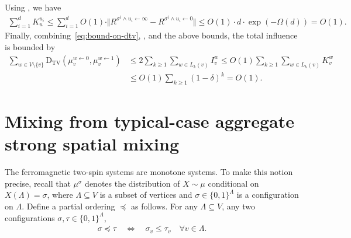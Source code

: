 \documentclass[11pt]{amsart}
\def\-#1{\mathrm{#1}}
\newcommand{\DTV}[2]{\-D_{\mathrm{TV}}\left({#1},{#2}\right)}
\theoremstyle{definition}
\theoremstyle{remark}
\begin{document}
Using , we have
\begin{align*}
\sum_{i=1}^d K_{u}^{u_i} \leq \sum_{i=1}^d O(1) \cdot \Vert R^{\sigma^i \land u_i \gets \infty} - R^{\sigma^i \land u_i \gets 0} \Vert \leq O(1) \cdot d \cdot \exp(-\Omega(d))= O(1).
\end{align*}
Finally, combining~\eqref{eq:bound-on-dtv}, , and the above bounds, the total influence is bounded by
\begin{align*}
    \sum_{w \in V \setminus \{v\}} \DTV{\mu_v^{w \gets 0}}{\mu_v^{w \gets 1}} &\leq 2\sum_{k \geq 1} \sum_{w \in L_k(v)} I_v^w \leq O(1) \sum_{k \geq 1} \sum_{w \in L_k(v)} K_v^w\\
    &\leq O(1) \sum_{k \geq 1} (1 - \delta)^k = O(1).
\end{align*}












\section{Mixing from typical-case aggregate strong spatial mixing}

The ferromagnetic two-spin systems are monotone systems.
To make this notion precise, recall that $\mu^\sigma$ denotes the distribution of $X \sim \mu$ conditional on $X(\Lambda) = \sigma$,
where $\Lambda \subseteq V$ is a subset of vertices and $\sigma \in \{0,1\}^{\Lambda}$ is a configuration on $\Lambda$. 
Define a partial ordering $\preceq$ as follows. 
For any $\Lambda \subseteq V$, any two configurations $\sigma,\tau \in \{0,1\}^{\Lambda}$, 
\begin{align}
  \sigma \preceq \tau \quad \Leftrightarrow \quad \sigma_v \leq \tau_v \quad \forall v \in \Lambda.\label{eq:partial-order-on-configurations}
\end{align}
\end{document}
